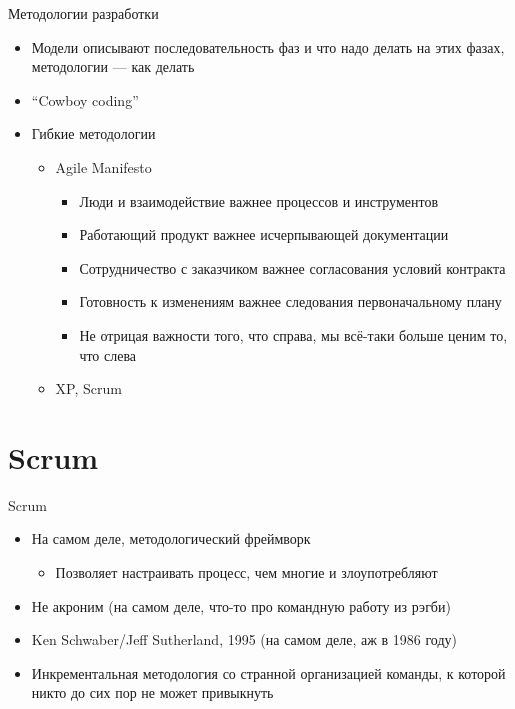 \documentclass{../../slides-style}
\begin{document}
    \begin{frame}{Методологии разработки}
        \begin{itemize}
            \item Модели описывают последовательность фаз и что надо делать на этих фазах, методологии --- как делать
            \item ``Cowboy coding''
            \item Гибкие методологии
            \begin{itemize}
                \item Agile Manifesto
                \begin{itemize}
                    \item Люди и взаимодействие важнее процессов и инструментов
                    \item Работающий продукт важнее исчерпывающей документации
                    \item Сотрудничество с заказчиком важнее согласования условий контракта
                    \item Готовность к изменениям важнее следования первоначальному плану
                    \item Не отрицая важности того, что справа, мы всё-таки больше ценим то, что слева
                \end{itemize}
                \item XP, Scrum
            \end{itemize}
        \end{itemize}
    \end{frame}

    \section{Scrum}

    \begin{frame}{Scrum}
        \begin{itemize}
            \item На самом деле, методологический фреймворк
            \begin{itemize}
                \item Позволяет настраивать процесс, чем многие и злоупотребляют
            \end{itemize}
            \item Не акроним (на самом деле, что-то про командную работу из рэгби)
            \item Ken Schwaber/Jeff Sutherland, 1995 (на самом деле, аж в 1986 году)
            \item Инкрементальная методология со странной организацией команды, к которой никто до сих пор не может привыкнуть
        \end{itemize}
    \end{frame}
\end{document}
